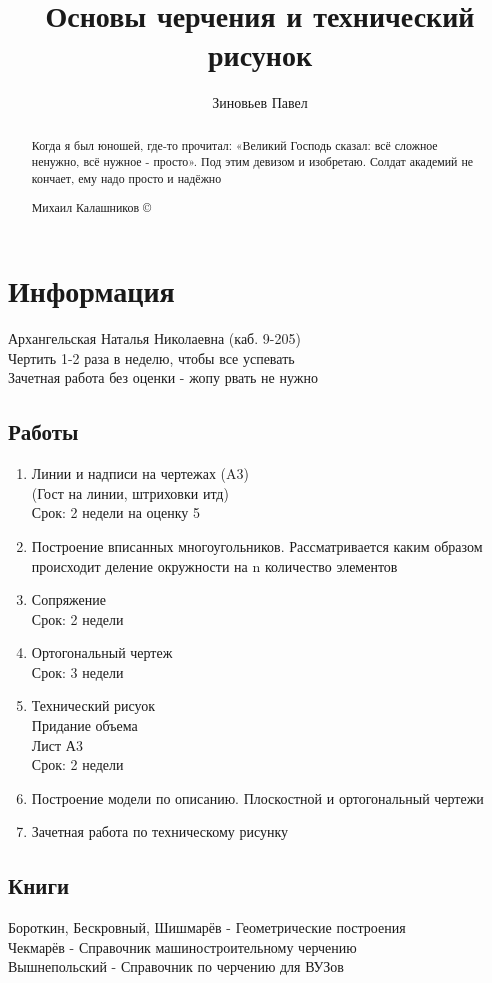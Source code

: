 \documentclass[a4paper, 11pt, oneside]{article}
\title{Основы черчения и технический рисунок}
\author{Зиновьев Павел}
\begin{document}
\maketitle
\begin{abstract}
	Когда я был юношей, где-то прочитал: «Великий Господь сказал: 
	всё сложное ненужно, всё нужное - просто». Под этим девизом и изобретаю. 
	Солдат академий не кончает, ему надо просто и надёжно
	\begin{flushright}
		 Михаил Калашников \copyright
	\end{flushright}
\end{abstract}
\newpage
\tableofcontents
\newpage

\section{Информация}
Архангельская Наталья Николаевна (каб. 9-205)\\
Чертить 1-2 раза в неделю, чтобы все успевать\\
Зачетная работа без оценки - жопу рвать не нужно\\
\subsection{Работы}
\begin{enumerate}
	\item Линии и надписи на чертежах (A3)\\
		(Гост на линии, штриховки итд)\\
		Срок: 2 недели на оценку 5
	\item Построение вписанных многоугольников. Рассматривается каким образом происходит
		деление окружности на n количество элементов
	\item Сопряжение\\
		Срок: 2 недели
	\item Ортогональный чертеж\\
		Срок: 3 недели
	\item Технический рисуок\\
		Придание объема\\
		Лист А3\\
		Срок: 2 недели
	\item Построение модели по описанию. Плоскостной и ортогональный чертежи
	\item Зачетная работа по техническому рисунку
\end{enumerate}
\subsection{Книги}
Бороткин, Бескровный, Шишмарёв - Геометрические построения\\
Чекмарёв - Справочник машиностроительному черчению\\
Вышнепольский - Справочник по черчению для ВУЗов
\end{document}
